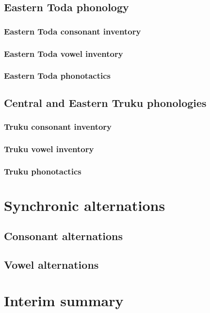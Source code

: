 \documentclass[master]{NTHUthesis}
\begin{document}
\subsection{Eastern Toda phonology}
\lipsum[1]

\subsubsection{Eastern Toda consonant inventory}
\subsubsection{Eastern Toda vowel inventory}
\subsubsection{Eastern Toda phonotactics}

\subsection{Central and Eastern Truku phonologies}
\lipsum[1]

\subsubsection{Truku consonant inventory}
\subsubsection{Truku vowel inventory}
\subsubsection{Truku phonotactics}

\section{Synchronic alternations}
\lipsum[1]
\subsection{Consonant alternations}
\lipsum[1]
\subsection{Vowel alternations}
\lipsum[1]

\section{Interim summary}
\lipsum[1]
\end{document}
